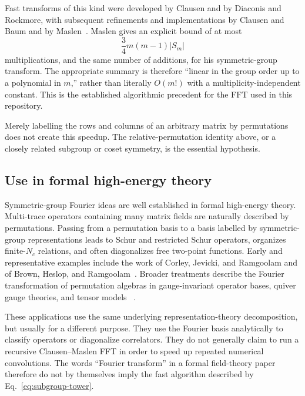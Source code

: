 \documentclass[11pt,a4paper]{article}
\begin{document}
Fast transforms of this kind were developed by Clausen and by Diaconis and
Rockmore, with subsequent refinements and implementations by Clausen and Baum
and by Maslen~\cite{clausen1989,diaconisrockmore1990,clausenbaum1993,maslen1998}.
Maslen gives an explicit bound of at most
\begin{equation}
  \frac{3}{4}m(m-1)|S_m|
\end{equation}
multiplications, and the same number of additions, for his symmetric-group
transform.  The appropriate summary is therefore ``linear in the group order
up to a polynomial in $m$,'' rather than literally $O(m!)$ with a
multiplicity-independent constant.  This is the established algorithmic
precedent for the FFT used in this repository.

Merely labelling the rows and columns of an arbitrary matrix by permutations
does not create this speedup.  The relative-permutation identity above, or a
closely related subgroup or coset symmetry, is the essential hypothesis.

\subsection{Use in formal high-energy theory}

Symmetric-group Fourier ideas are well established in formal high-energy
theory.  Multi-trace operators containing many matrix fields are naturally
described by permutations.  Passing from a permutation basis to a basis
labelled by symmetric-group representations leads to Schur and restricted
Schur operators, organizes finite-$N_c$ relations, and often diagonalizes
free two-point functions.  Early and representative examples include the
work of Corley, Jevicki, and Ramgoolam and of Brown, Heslop, and
Ramgoolam~\cite{Corley:2001zk,Brown:2007xh}.  Broader treatments describe the
Fourier transformation of permutation algebras in gauge-invariant operator
bases, quiver gauge theories, and tensor models
~\cite{Ramgoolam:2016ciq,Mattioli:2016gyl,BenGeloun:2017vwn}.

These applications use the same underlying representation-theory
decomposition, but usually for a different purpose.  They use the Fourier
basis analytically to classify operators or diagonalize correlators.  They do
not generally claim to run a recursive Clausen--Maslen FFT in order to speed
up repeated numerical convolutions.  The words ``Fourier transform'' in a
formal field-theory paper therefore do not by themselves imply the fast
algorithm described by Eq.~\eqref{eq:subgroup-tower}.
\end{document}
